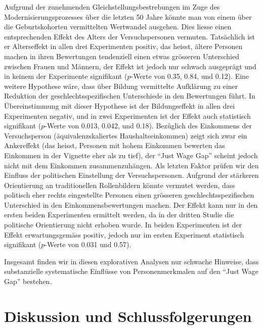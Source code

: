 \documentclass[a4paper,12pt]{article}
\begin{document}
Aufgrund der zunehmenden Gleichstellungsbestrebungen im Zuge des
Modernisierungsprozesses über die letzten 50 Jahre könnte man von einem über
die Geburtskohorten vermittelten Wertwandel ausgehen. Dies liesse einen
entsprechenden Effekt des Alters der Versuchspersonen vermuten. Tatsächlich ist
er Alterseffekt in allen drei Experimenten positiv, das heisst, ältere Personen
machen in ihren Bewertungen tendenziell einen etwas grösseren Unterschied
zwischen Frauen und Männern, der Effekt ist jedoch nur schwach ausgeprägt und in
keinem der Experimente signifikant ($p$-Werte von 0.35, 0.84, und 0.12). Eine
weitere Hypothese wäre, dass über Bildung vermittelte Aufklärung zu einer
Reduktion der geschlechtsspezifischen Unterschiede in den Bewertungen führt. In
Übereinstimmung mit dieser Hypothese ist der Bildungseffekt in allen drei
Experimenten negativ, und in zwei Experimenten ist der Effekt auch statistisch
signifikant ($p$-Werte von 0.013, 0.042, und 0.18). Bezüglich des Einkommens
der Versuchsperson (äquivalenzskaliertes Haushaltseinkommen) zeigt sich zwar
ein Ankereffekt (das heisst, Personen mit hohem Einkommen bewerten das
Einkommen in der Vignette eher als zu tief), der “Just Wage Gap” scheint jedoch
nicht mit dem Einkommen zusammenzuhängen. Als letzten Faktor prüfen wir den
Einfluss der politischen Einstellung der Versuchspersonen. Aufgrund der
stärkeren Orientierung an traditionellen Rollenbildern könnte vermutet werden,
dass politisch eher rechts eingestellte Personen einen grösseren
geschlechtsspezifischen Unterschied in den Einkommensbewertungen machen. Der
Effekt kann nur in den ersten beiden Experimenten ermittelt werden, da in der
dritten Studie die politische Orientierung nicht erhoben wurde. In beiden
Experimenten ist der Effekt erwartungsgemäss positiv, jedoch nur im ersten
Experiment statistisch signifikant ($p$-Werte von 0.031 und 0.57).

Insgesamt finden wir in diesen explorativen Analysen nur schwache Hinweise, dass
substanzielle systematische Einflüsse von Personenmerkmalen auf den “Just Wage Gap” bestehen.

\section{Diskussion und Schlussfolgerungen}
\end{document}

